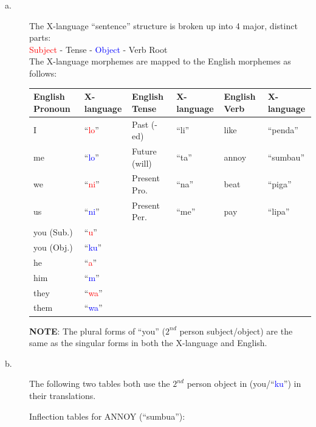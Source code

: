 \documentclass[11pt]{article}
\begin{document}
\newpage

\begin{solution}

\begin{description}
\item[a.] The X-language ``sentence'' structure is broken up into 4 major, distinct parts: \\
\textcolor{red}{Subject} - \textcolor{OliveGreen}{Tense} - \textcolor{blue}{Object} - \textcolor{BurntOrange}{Verb Root} \\
The X-language morphemes are mapped to the English morphemes as follows:

\begin{tabular}{l l | l l | l l}
English Pronoun & X-language & English Tense & X-language & English Verb & X-language \\ \hline 
I & ``\textcolor{red}{lo}'' & Past (-ed) & ``\textcolor{OliveGreen}{li}'' & like & ``\textcolor{BurntOrange}{penda}'' \\
me & ``\textcolor{blue}{lo}'' & Future (will) & ``\textcolor{OliveGreen}{ta}'' & annoy & ``\textcolor{BurntOrange}{sumbau}'' \\
we & ``\textcolor{red}{ni}'' & Present Pro. & ``\textcolor{OliveGreen}{na}'' & beat & ``\textcolor{BurntOrange}{piga}'' \\
us & ``\textcolor{blue}{ni}'' & Present Per. & ``\textcolor{OliveGreen}{me}'' & pay & ``\textcolor{BurntOrange}{lipa}'' \\
you (Sub.) & ``\textcolor{red}{u}'' & & & &  \\
you (Obj.) & ``\textcolor{blue}{ku}'' & & & & \\
he & ``\textcolor{red}{a}'' & & & & \\
him & ``\textcolor{blue}{m}'' & & & & \\
they & ``\textcolor{red}{wa}'' & & & & \\
them & ``\textcolor{blue}{wa}'' & & & & \\
\end{tabular}

\textbf{NOTE}: The plural forms of ``you'' ($2^{nd}$ person subject/object) are the same as the singular forms in both the X-language and English.

\item[b.] The following two tables both use the $2^{nd}$ person object in (you/``\textcolor{blue}{ku}'') in their translations.

Inflection tables for ANNOY (``\textcolor{BurntOrange}{sumbua}''):


\end{description}
\end{solution}
\end{document}
